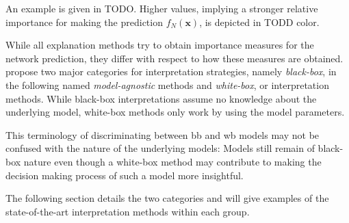An example is given in TODO. Higher values, implying a stronger relative importance for making the prediction $f_N(\mathbf{x})$, is depicted in TODD color. 



While all explanation methods try to obtain importance measures for the network prediction, they differ with respect to how these measures are obtained. 
\cite{evaluating_explanations_security} propose two major categories for interpretation strategies, namely \textit{black-box}, in the following named \textit{model-agnostic} methods and \textit{white-box}, or \textit{} interpretation methods. 
While black-box interpretations assume no knowledge about the underlying model, white-box methods only work by using the model parameters. 

This terminology of discriminating between bb and wb models may not be confused with the nature of the underlying models: Models still remain of black-box nature even though a white-box method may contribute to making the decision making process of such a model more insightful. %


The following section details the two categories and will give examples of the state-of-the-art interpretation methods within each group. 






